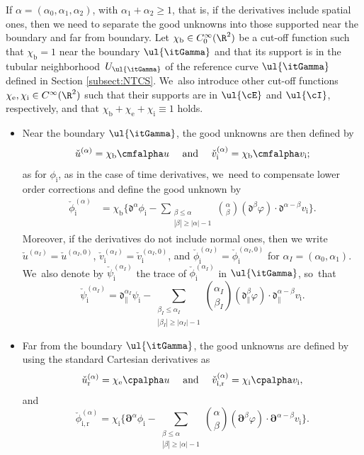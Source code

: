 If $\alpha=(\alpha_0,\alpha_1,\alpha_2)$, with $\alpha_1+\alpha_2\geq 1$, that is, if the derivatives include spatial ones,
then we need to separate the good unknowns into those supported near the boundary and far from boundary.
Let $\chi_\mathrm{b}\in C_0^\infty(\R^2)$ be a cut-off function such that $\chi_\mathrm{b}=1$ near the boundary $\ul{\itGamma}$ and that its support is in the
tubular neighborhood~$U_{\ul{\itGamma}}$ of the reference curve $\ul{\itGamma}$ defined in Section \ref{subsect:NTCS}. We~also introduce other cut-off functions $\chi_\mathrm{e},\chi_\mathrm{i}\in C^\infty(\R^2)$ such that their supports are in $\ul{\cE}$ and $\ul{\cI}$, respectively,
and that $\chi_\mathrm{b}+\chi_\mathrm{e}+\chi_\mathrm{i}\equiv1$ holds.
\begin{itemize}
\item
Near the boundary $\ul{\itGamma}$, the good unknowns are then defined by
\[
\check{u}^{(\alpha)} = \chi_\mathrm{b} \cmfalpha u
\quad\mbox{ and }\quad
\check{v}_\mathrm{i}^{(\alpha)} = \chi_\mathrm{b} \cmfalpha v_\mathrm{i};
\]
as for $\phi_\mathrm{i}$, as in the case of time derivatives, we~need to compensate lower order corrections and define the good unknown by
\begin{align*}
\check{\phi}_\mathrm{i}^{(\alpha)}
&= \chi_\mathrm{b} \biggl\{ \mathfrak{d}^{\alpha}\phi_\mathrm{i} - \sum_{\substack{\beta\leq\alpha\\ |\beta|\geq|\alpha|-1}} \binom{\alpha}{\beta}
(\mathfrak{d}^{\beta}\varphi)\cdot \mathfrak{d}^{\alpha-\beta}v_\mathrm{i} \biggr\}.
\end{align*}
Moreover, if the derivatives do not include normal ones, then we write $\check{u}^{(\alpha_I)}=\check{u}^{(\alpha_I,0)}$,
$\check{v}_\mathrm{i}^{(\alpha_I)}=\check{v}_\mathrm{i}^{(\alpha_I,0)}$,
and $\check{\phi}_\mathrm{i}^{(\alpha_I)}=\check{\phi}_\mathrm{i}^{(\alpha_I,0)}$ for $\alpha_I=(\alpha_0,\alpha_1)$. We~also denote by $\check\psi_\mathrm{i}^{(\alpha_{I})}$ the trace of $\check{\phi}_\mathrm{i}^{(\alpha_I)}$ in $\ul{\itGamma}$, so~that
\[
\check\psi_\mathrm{i}^{(\alpha_{I})}=\mathfrak{d}_\parallel^{\alpha_{I}}\psi_\mathrm{i} - \sum_{\substack{\beta_I\leq\alpha_I\\ |\beta_I|\geq|\alpha_I|-1}} \binom{\alpha_I}{\beta_I}
(\mathfrak{d}_\parallel^{\beta}\varphi)\cdot \mathfrak{d}_\parallel^{\alpha-\beta}v_\mathrm{i}.
\]
\item
Far from the boundary $\ul{\itGamma}$, the good unknowns are defined by using the standard Cartesian derivatives as
\[
\check{u}_\mathrm{r}^{(\alpha)} = \chi_\mathrm{e} \cpalpha u
\quad\mbox{ and }\quad
\check{v}_\mathrm{i,r}^{(\alpha)} = \chi_\mathrm{i}\cpalpha v_\mathrm{i},
\]
and
\[
\check{\phi}_\mathrm{i,r}^{(\alpha)}
= \chi_\mathrm{i} \biggl\{ \bm{\partial}^\alpha\phi_\mathrm{i} - \sum_{\substack{\beta\leq\alpha\\ |\beta|\geq|\alpha|-1}} \binom{\alpha}{\beta}
(\bm{\partial}^{\beta}\varphi)\cdot\bm{\partial}^{\alpha-\beta}v_\mathrm{i} \biggr\}.
\]
\end{itemize}

